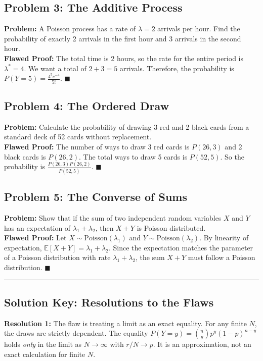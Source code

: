 \documentclass[11pt]{article}
\theoremstyle{definition}
\theoremstyle{remark}
\begin{document}
\subsection{Problem 3: The Additive Process}
\textbf{Problem:} A Poisson process has a rate of $\lambda = 2$ arrivals per hour. Find the probability of exactly 2 arrivals in the first hour and 3 arrivals in the second hour. \\
\textbf{Flawed Proof:} The total time is 2 hours, so the rate for the entire period is $\lambda^* = 4$. We want a total of $2 + 3 = 5$ arrivals. Therefore, the probability is $P(Y=5) = \frac{4^5 e^{-4}}{5!}$. $\blacksquare$

\subsection{Problem 4: The Ordered Draw}
\textbf{Problem:} Calculate the probability of drawing 3 red and 2 black cards from a standard deck of 52 cards without replacement. \\
\textbf{Flawed Proof:} The number of ways to draw 3 red cards is $P(26, 3)$ and 2 black cards is $P(26, 2)$. The total ways to draw 5 cards is $P(52, 5)$. So the probability is $\frac{P(26,3) P(26,2)}{P(52,5)}$. $\blacksquare$

\subsection{Problem 5: The Converse of Sums}
\textbf{Problem:} Show that if the sum of two independent random variables $X$ and $Y$ has an expectation of $\lambda_1 + \lambda_2$, then $X+Y$ is Poisson distributed. \\
\textbf{Flawed Proof:} Let $X \sim \text{Poisson}(\lambda_1)$ and $Y \sim \text{Poisson}(\lambda_2)$. By linearity of expectation, $\mathbb{E}[X+Y] = \lambda_1 + \lambda_2$. Since the expectation matches the parameter of a Poisson distribution with rate $\lambda_1 + \lambda_2$, the sum $X+Y$ must follow a Poisson distribution. $\blacksquare$

\vspace{2em}
\hrule
\vspace{2em}

\subsection{Solution Key: Resolutions to the Flaws}

\textbf{Resolution 1:} The flaw is treating a limit as an exact equality. For any finite $N$, the draws are strictly dependent. The equality $P(Y=y) = \binom{n}{y} p^y (1 - p)^{n-y}$ holds \textit{only} in the limit as $N \to \infty$ with $r/N \to p$. It is an approximation, not an exact calculation for finite $N$.
\end{document}
